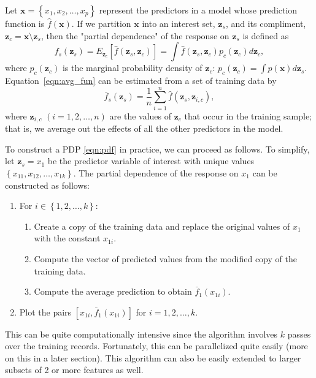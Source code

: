 Let $\boldsymbol{x} = \left\{x_1, x_2, \dots, x_p\right\}$ represent the predictors in a model whose prediction function is $\widehat{f}\left(\boldsymbol{x}\right)$. If we partition $\boldsymbol{x}$ into an interest set, $\boldsymbol{z}_s$, and its compliment, $\boldsymbol{z}_c = \boldsymbol{x} \setminus \boldsymbol{z}_s$, then the "partial dependence" of the response on $\boldsymbol{z}_s$ is defined as
\begin{equation}
\label{eqn:avg_fun}
  f_s\left(\boldsymbol{z}_s\right) = E_{\boldsymbol{z}_c}\left[\widehat{f}\left(\boldsymbol{z}_s, \boldsymbol{z}_c\right)\right] = \int \widehat{f}\left(\boldsymbol{z}_s, \boldsymbol{z}_c\right)p_{c}\left(\boldsymbol{z}_c\right)d\boldsymbol{z}_c,
\end{equation}
where $p_{c}\left(\boldsymbol{z}_c\right)$ is the marginal probability density of $\boldsymbol{z}_c$: $p_{c}\left(\boldsymbol{z}_c\right) = \int p\left(\boldsymbol{x}\right)d\boldsymbol{z}_s$.
Equation~\eqref{eqn:avg_fun} can be estimated from a set of training data by
\begin{equation}
\label{eqn:pdf}
\bar{f}_s\left(\boldsymbol{z}_s\right) = \frac{1}{n}\sum_{i = 1}^n\widehat{f}\left(\boldsymbol{z}_s,\boldsymbol{z}_{i, c}\right),
\end{equation}
where $\boldsymbol{z}_{i, c}$ $\left(i = 1, 2, \dots, n\right)$ are the values of $\boldsymbol{z}_c$ that occur in the training sample; that is, we average out the effects of all the other predictors in the model.

To construct a PDP \eqref{eqn:pdf} in practice, we can proceed as follows. To simplify, let $\boldsymbol{z}_s = x_1$ be the predictor variable of interest with unique values $\left\{x_{11}, x_{12}, \dots, x_{1k}\right\}$. The partial dependence of the response on $x_1$ can be constructed as follows:
\begin{enumerate}
  \item For $i \in \left\{1, 2, \dots, k\right\}$:
  \begin{enumerate}
    \item Create a copy of the training data and replace the original values of $x_1$ with the constant $x_{1i}$.
    \item Compute the vector of predicted values from the modified copy of the training data.
    \item Compute the average prediction to obtain $\bar{f}_1\left(x_{1i}\right)$.
  \end{enumerate}
  \item Plot the pairs $\left[x_{1i}, \bar{f}_1\left(x_{1i}\right)\right]$ for $i = 1, 2, \dotsc, k$.
\end{enumerate}
This can be quite computationally intensive since the algorithm involves $k$ passes over the training records. Fortunately, this can be parallelized quite easily (more on this in a later section). This algorithm can also be easily extended to larger subsets of 2 or more features as well.

